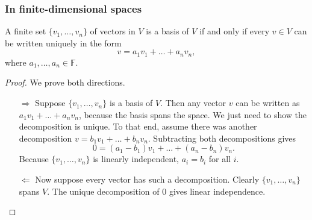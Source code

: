 \subsubsection{In finite-dimensional spaces}
\begin{proposition} \label{finiteBasisUniqueDecomposition}
A finite set $\{v_1, \ldots, v_n\}$ of vectors in $V$ is a basis of $V$ \textup{if and only if} every $v\in V$ can be written uniquely in the form
\[ v = a_1v_1 + \ldots + a_nv_n, \]
where $a_1, \ldots, a_n \in \mathbb{F}$.
\end{proposition}
\begin{proof}
We prove both directions.
\begin{itemize}
\item[$\boxed{\Rightarrow}$] Suppose $\{v_1, \ldots, v_n\}$ is a basis of $V$. Then any vector $v$ can be written as $a_1v_1 + \ldots + a_nv_n$, because the basis spans the space. We just need to show the decomposition is unique. To that end, assume there was another decomposition $v = b_1v_1 + \ldots + b_nv_n$. Subtracting both decompositions gives
\[ 0 = (a_1-b_1)v_1 + \ldots + (a_n-b_n)v_n. \]
Because $\{v_1, \ldots, v_n\}$ is linearly independent, $a_i = b_i$ for all $i$.
\item[$\boxed{\Leftarrow}$] Now suppose every vector has such a decomposition. Clearly $\{v_1, \ldots, v_n\}$ spans $V$. The unique decomposition of $0$ gives linear independence.
\end{itemize}
\end{proof}

